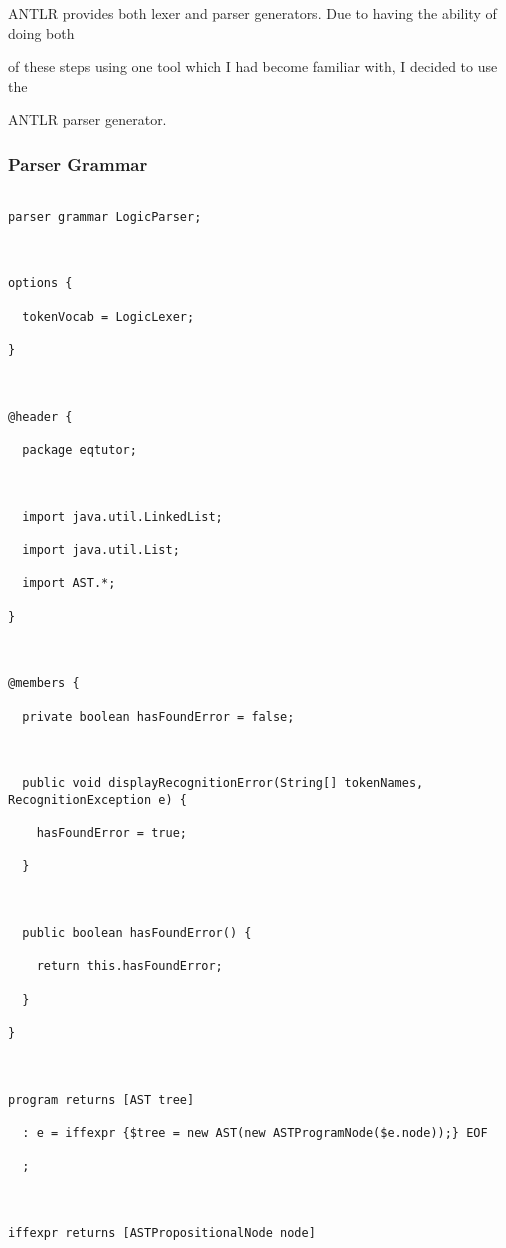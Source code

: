 \documentclass{report}
\begin{document}
ANTLR provides both lexer and parser generators. Due to having the ability of doing both

of these steps using one tool which I had become familiar with, I decided to use the

ANTLR parser generator.





\subsubsection{Parser Grammar}



\begin{verbatim}

parser grammar LogicParser;



options {

  tokenVocab = LogicLexer;

}



@header {

  package eqtutor;



  import java.util.LinkedList;

  import java.util.List;

  import AST.*;

}



@members {

  private boolean hasFoundError = false;



  public void displayRecognitionError(String[] tokenNames, RecognitionException e) {

    hasFoundError = true;

  }



  public boolean hasFoundError() {

    return this.hasFoundError;

  }

}



program returns [AST tree]

  : e = iffexpr {$tree = new AST(new ASTProgramNode($e.node));} EOF

  ;



iffexpr returns [ASTPropositionalNode node]


\end{verbatim}
\end{document}
